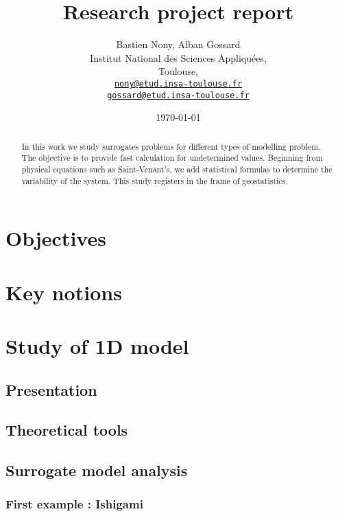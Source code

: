 \documentclass[hidelinks,12pt]{article}
\begin{document}
\title{Research project report}
\author{Bastien Nony, Alban Gossard\\
Institut National des Sciences Appliquées,\\
Toulouse,\\
\href{mailto:nony@etud.insa-toulouse.fr}{   \texttt{nony@etud.insa-toulouse.fr}}\\
\href{mailto:gossard@etud.insa-toulouse.fr}{   \texttt{gossard@etud.insa-toulouse.fr}}}
\date{\today}

\maketitle

\begin{abstract}
In this work we study surrogates problems for different types of modelling problem. The objective is to provide fast calculation for undetermined values. Beginning from physical equations such as Saint-Venant's, we add statistical formulas to determine the variability of the system. This study registers in the frame of geostatistics.
\end{abstract}

\newpage

\tableofcontents



\section{Objectives}
\section{Key notions}
\section{Study of 1D model}
\subsection{Presentation}
\subsection{Theoretical tools}
\subsection{Surrogate model analysis}
\subsubsection{First example : Ishigami}
\end{document}
